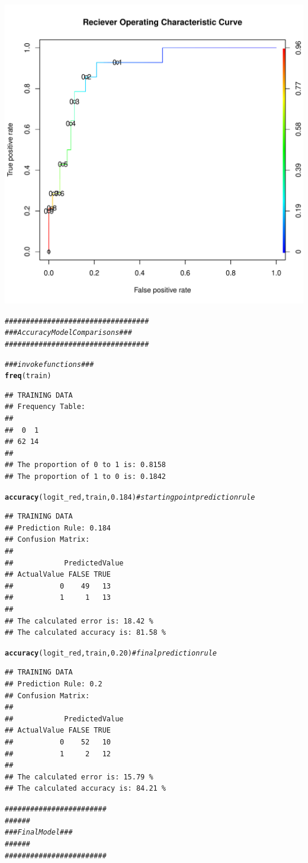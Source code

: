\documentclass{article}\usepackage[]{graphicx}\usepackage[]{color}
\makeatletter
\def\maxwidth{ %
  \ifdim\Gin@nat@width>\linewidth
    \linewidth
  \else
    \Gin@nat@width
  \fi
}
\newcommand{\hlnum}[1]{\textcolor[rgb]{0.686,0.059,0.569}{#1}}%
\newcommand{\hlcom}[1]{\textcolor[rgb]{0.678,0.584,0.686}{\textit{#1}}}%
\newcommand{\hlstd}[1]{\textcolor[rgb]{0.345,0.345,0.345}{#1}}%
\newcommand{\hlkwd}[1]{\textcolor[rgb]{0.737,0.353,0.396}{\textbf{#1}}}%
\newenvironment{kframe}{%
 \def\at@end@of@kframe{}%
 \ifinner\ifhmode%
  \def\at@end@of@kframe{\end{minipage}}%
  \begin{minipage}{\columnwidth}%
 \fi\fi%
 \def\FrameCommand##1{\hskip\@totalleftmargin \hskip-\fboxsep
 \colorbox{shadecolor}{##1}\hskip-\fboxsep
     \hskip-\linewidth \hskip-\@totalleftmargin \hskip\columnwidth}%
 \MakeFramed {\advance\hsize-\width
   \@totalleftmargin\z@ \linewidth\hsize
   \@setminipage}}%
 {\par\unskip\endMakeFramed%
 \at@end@of@kframe}
\newenvironment{knitrout}{}{} %
\makeatother
\begin{document}
\begin{knitrout}
\includegraphics[width=\maxwidth]{figure/unnamed-chunk-1-3} 
\begin{kframe}\begin{alltt}
\hlcom{##################################}
\hlcom{### Accuracy Model Comparisons ###}
\hlcom{##################################}

\hlcom{### invoke functions ###}
\hlkwd{freq}\hlstd{(train)}
\end{alltt}
\begin{verbatim}
## TRAINING DATA
## Frequency Table:
## 
##  0  1 
## 62 14 
## 
## The proportion of 0 to 1 is: 0.8158 
## The proportion of 1 to 0 is: 0.1842
\end{verbatim}
\begin{alltt}
\hlkwd{accuracy}\hlstd{(logit_red, train,} \hlnum{0.184}\hlstd{)} \hlcom{# starting point prediction rule}
\end{alltt}
\begin{verbatim}
## TRAINING DATA
## Prediction Rule: 0.184 
## Confusion Matrix:
##  
##            PredictedValue
## ActualValue FALSE TRUE
##           0    49   13
##           1     1   13
## 
## The calculated error is: 18.42 %
## The calculated accuracy is: 81.58 %
\end{verbatim}
\begin{alltt}
\hlkwd{accuracy}\hlstd{(logit_red, train,} \hlnum{0.20}\hlstd{)} \hlcom{# final prediction rule}
\end{alltt}
\begin{verbatim}
## TRAINING DATA
## Prediction Rule: 0.2 
## Confusion Matrix:
##  
##            PredictedValue
## ActualValue FALSE TRUE
##           0    52   10
##           1     2   12
## 
## The calculated error is: 15.79 %
## The calculated accuracy is: 84.21 %
\end{verbatim}
\begin{alltt}
\hlcom{########################}
\hlcom{###                  ###}
\hlcom{###    Final Model   ###}
\hlcom{###                  ###}
\hlcom{########################}


\end{alltt}
\end{kframe}
\end{knitrout}
\end{document}
